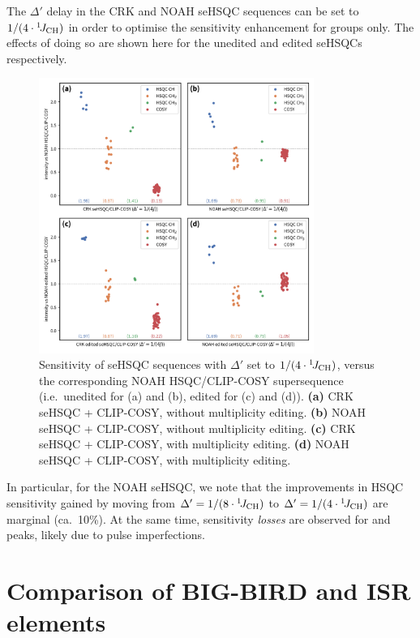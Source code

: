 The $\Delta'$ delay in the CRK and NOAH seHSQC sequences can be set to $1/(4\cdot\onejch)$ in order to optimise the sensitivity enhancement for  groups only.
The effects of doing so are shown here for the unedited and edited seHSQCs respectively.

\begin{figure}
    \centering
    \includegraphics[width=0.8\textwidth]{./figures/combined_1_4j.png}
    \caption{
        Sensitivity of seHSQC sequences with $\Delta'$ set to $1/(4\cdot\onejch)$, versus the corresponding NOAH HSQC/CLIP-COSY supersequence (i.e.\ unedited for (a) and (b), edited for (c) and (d)).
        \andro{}
        \textbf{(a)} CRK seHSQC + CLIP-COSY, without multiplicity editing.
        \textbf{(b)} NOAH seHSQC + CLIP-COSY, without multiplicity editing.
        \textbf{(c)} CRK seHSQC + CLIP-COSY, with multiplicity editing.
        \textbf{(d)} NOAH seHSQC + CLIP-COSY, with multiplicity editing.
    }
    \label{fig:combined_1_4j}
\end{figure}

In particular, for the NOAH seHSQC, we note that the improvements in HSQC  sensitivity gained by moving from $\Delta' = 1/(8\cdot\onejch)$ to $\Delta' = 1/(4\cdot\onejch)$ are marginal (ca.\ 10\%).
At the same time, sensitivity \textit{losses} are observed for  and  peaks, likely due to pulse imperfections.

\section{Comparison of BIG-BIRD and ISR elements}

